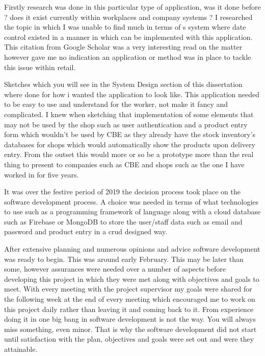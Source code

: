 Firstly research was done in this particular type of application, was it done before ? does it exist currently within workplaces and company systems ? I researched the topic in which I was unable to find much in terms of s system where date control existed in a manner in which can be implemented with this application. This citation from Google Scholar \cite{nakano2006food} was a very interesting read on the matter however gave me no indication an application or method was in place to tackle this issue within retail. 
\newline

Sketches which you will see in the System Design section of this dissertation where done for how i wanted the application to look like. This application needed to be easy to use and understand for the worker, not make it fancy and complicated. I knew when sketching that implementation of some elements that may not be used by the shop such as user authentication and a product entry form which wouldn't be used by CBE as they already have the stock inventory's databases for shops which would automatically show the products upon delivery entry. From the outset this would more or so be a prototype more than the real thing to present to companies such as CBE and shops such as the one I have worked in for five years. 
\newline

It was over the festive period of 2019 the decision process took place on the software development process. A choice was needed in terms of what technologies to use such as a programming framework of language along with a cloud database such as Firebase or MongoDB to store the user/staff data such as email and password and product entry in a crud designed way.
\newline

After extensive planning and numerous opinions and advice software development was ready to begin. This was around early February. This may be later than some, however assurances were needed over a number of aspects before developing this project in which they were met along with objectives and goals to meet. With every meeting with the project supervisor my goals were shared for the following week at the end of every meeting which encouraged me to work on this project daily rather than leaving it and coming back to it. From experience doing it in one big bang in software development is not the way. You will always miss something, even minor. That is why the software development did not start until satisfaction with the plan, objectives and goals were set out and were they attainable.

